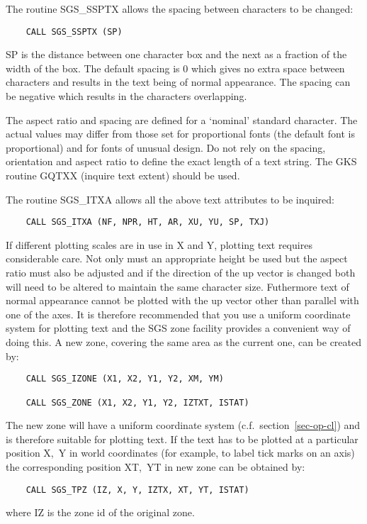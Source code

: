 The routine SGS\_SSPTX allows the spacing between characters
to be changed:
\begin{verbatim}
    CALL SGS_SSPTX (SP)
\end{verbatim}
SP is the distance between one character box and the next as
a fraction of the width of the box.  The default spacing is 0 which
gives no extra space between characters and results in the text being
of normal appearance.  The spacing can be negative which results in the
characters overlapping.

The aspect ratio and spacing are defined for a `nominal' standard 
character.  The actual values may differ from those set for proportional fonts 
(the default font is proportional) and for fonts of unusual design.  Do
not rely on the spacing, orientation and aspect ratio to define
the exact length
of a text string.  The GKS routine GQTXX (inquire text extent) should be 
used.

The routine SGS\_ITXA allows all the above text attributes to be inquired:
\begin{verbatim}
    CALL SGS_ITXA (NF, NPR, HT, AR, XU, YU, SP, TXJ)
\end{verbatim}
If different plotting scales are in use in X and Y, plotting text requires
considerable care.  Not only must an appropriate height be used but the aspect
ratio must also be adjusted and if the direction of the up vector is changed
both will need to be altered to maintain the same character size.  Futhermore
text of normal appearance cannot be plotted with the up vector other than 
parallel with one of the axes.
It is therefore recommended that you use a uniform coordinate system for
plotting text and the SGS zone facility provides a convenient way of doing 
this.  A new zone, covering the same area as the current 
one, can be created by:
\begin{verbatim}
    CALL SGS_IZONE (X1, X2, Y1, Y2, XM, YM)

    CALL SGS_ZONE (X1, X2, Y1, Y2, IZTXT, ISTAT)
\end{verbatim}
The new zone will have a uniform coordinate system (c.f.\ 
section~\ref{sec-op-cl}) and is 
therefore suitable for plotting text.  If the text has to be plotted at a
particular position X,~Y in world coordinates (for example, to label tick
marks on an axis) the corresponding position XT,~YT in new zone can be obtained
by:
\begin{verbatim}
    CALL SGS_TPZ (IZ, X, Y, IZTX, XT, YT, ISTAT)
\end{verbatim}
where IZ is the zone id of the original zone.

